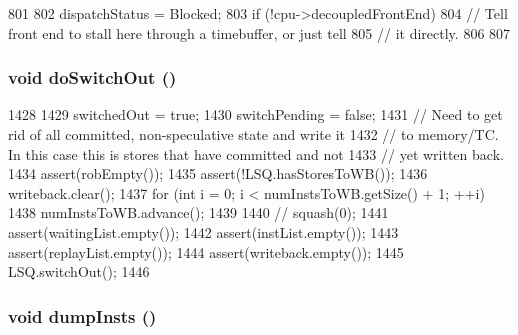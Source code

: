 \begin{DoxyCode}
801 {
802     dispatchStatus = Blocked;
803     if (!cpu->decoupledFrontEnd) {
804         // Tell front end to stall here through a timebuffer, or just tell
805         // it directly.
806     }
807 }
\end{DoxyCode}
\hypertarget{classLWBackEnd_a039b639c41c289e1cfe6d71c41d9308c}{
\subsubsection[{doSwitchOut}]{\setlength{\rightskip}{0pt plus 5cm}void doSwitchOut ()}}
\label{classLWBackEnd_a039b639c41c289e1cfe6d71c41d9308c}



\begin{DoxyCode}
1428 {
1429     switchedOut = true;
1430     switchPending = false;
1431     // Need to get rid of all committed, non-speculative state and write it
1432     // to memory/TC.  In this case this is stores that have committed and not
1433     // yet written back.
1434     assert(robEmpty());
1435     assert(!LSQ.hasStoresToWB());
1436     writeback.clear();
1437     for (int i = 0; i < numInstsToWB.getSize() + 1; ++i)
1438         numInstsToWB.advance();
1439 
1440 //    squash(0);
1441     assert(waitingList.empty());
1442     assert(instList.empty());
1443     assert(replayList.empty());
1444     assert(writeback.empty());
1445     LSQ.switchOut();
1446 }
\end{DoxyCode}
\hypertarget{classLWBackEnd_a80587b4fe043bbe1995536cb3b361588}{
\subsubsection[{dumpInsts}]{\setlength{\rightskip}{0pt plus 5cm}void dumpInsts ()}}
\label{classLWBackEnd_a80587b4fe043bbe1995536cb3b361588}



